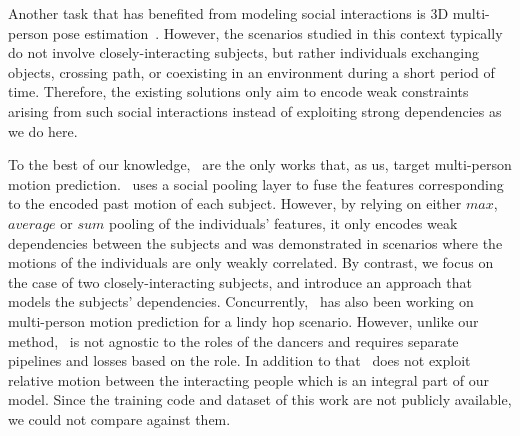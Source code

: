 Another task that has benefited from modeling social interactions is 3D multi-person pose estimation~\cite{Corona20a,Guo21,Wang20f,Ng20}. However, the scenarios studied in this context typically do not involve closely-interacting subjects, but rather individuals exchanging objects, crossing path, or coexisting in an environment during a short period of time. Therefore, the existing solutions only aim to encode weak constraints arising from such social interactions instead of exploiting strong dependencies as we do here.

To the best of our knowledge,~\cite{Adeli20,Guo21b} are the only works that, as us, target multi-person motion prediction.~\cite{Adeli20} uses a social pooling layer to fuse the features corresponding to the encoded past motion of each subject. However, by relying on either $\textit{max}$, $\textit{average}$ or $\textit{sum}$ pooling of the individuals' features, it only encodes weak dependencies between the subjects and was demonstrated in scenarios where the motions of the individuals are only weakly correlated. By contrast, we focus on the case of two closely-interacting subjects, and introduce an approach that models the subjects' dependencies. Concurrently,~\cite{Guo21b} has also been working on multi-person motion prediction for a lindy hop scenario. However, unlike our method,~\cite{Guo21b} is not agnostic to the roles of the dancers and requires separate pipelines and losses based on the role. In addition to that~\cite{Guo21b} does not exploit relative motion between the interacting people which is an integral part of our model. Since the training code and dataset of this work are not publicly available, we could not compare against them. 

\label{sec:related}

